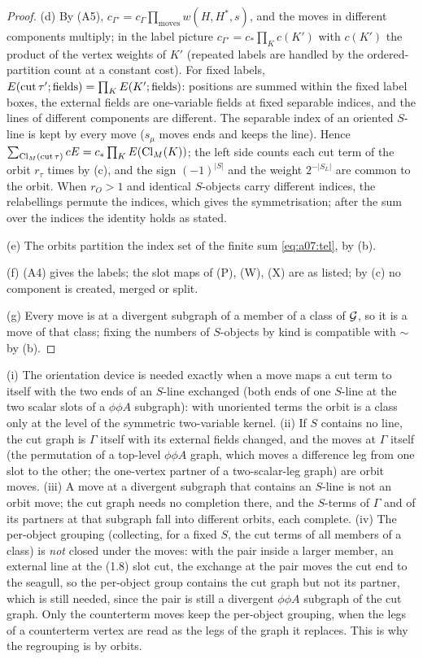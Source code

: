 \begin{proof}
(d) By (A5), $c_{\Gamma'}=c_\Gamma\prod_{\text{moves}}w(H,H^*,s)$, and the moves in different components multiply; in the label picture $c_{\Gamma'}=c_*\prod_Kc(K')$ with $c(K')$ the product of the vertex weights of $K'$ (repeated labels are handled by the ordered-partition count at a constant cost). For fixed labels, $E(\operatorname{cut}\tau';\text{fields})=\prod_KE(K';\text{fields})$: positions are summed within the fixed label boxes, the external fields are one-variable fields at fixed separable indices, and the lines of different components are different. The separable index of an oriented $S$-line is kept by every move ($s_\mu$ moves ends and keeps the line). Hence $\sum_{\operatorname{Cl}_M(\operatorname{cut}\tau)}cE=c_*\prod_KE(\operatorname{Cl}_M(K))$; the left side counts each cut term of the orbit $r_\tau$ times by (c), and the sign $(-1)^{|S|}$ and the weight $2^{-|S_L|}$ are common to the orbit. When $r_O>1$ and identical $S$-objects carry different indices, the relabellings permute the indices, which gives the symmetrisation; after the sum over the indices the identity holds as stated.

(e) The orbits partition the index set of the finite sum \eqref{eq:a07:tel}, by (b).

(f) (A4) gives the labels; the slot maps of (P), (W), (X) are as listed; by (c) no component is created, merged or split.

(g) Every move is at a divergent subgraph of a member of a class of $\mathcal G$, so it is a move of that class; fixing the numbers of $S$-objects by kind is compatible with $\sim$ by (b).
\end{proof}

\begin{remark}\label{rem:a07:orb}
(i) The orientation device is needed exactly when a move maps a cut term to itself with the two ends of an $S$-line exchanged (both ends of one $S$-line at the two scalar slots of a $\phi\phi A$ subgraph): with unoriented terms the orbit is a class only at the level of the symmetric two-variable kernel. (ii) If $S$ contains no line, the cut graph is $\Gamma$ itself with its external fields changed, and the moves at $\Gamma$ itself (the permutation of a top-level $\phi\phi A$ graph, which moves a difference leg from one slot to the other; the one-vertex partner of a two-scalar-leg graph) are orbit moves. (iii) A move at a divergent subgraph that contains an $S$-line is not an orbit move; the cut graph needs no completion there, and the $S$-terms of $\Gamma$ and of its partners at that subgraph fall into different orbits, each complete. (iv) The per-object grouping (collecting, for a fixed $S$, the cut terms of all members of a class) is \emph{not} closed under the moves: with the pair \cite[(2.18)]{Ba3} inside a larger member, an external line at the (1.8) slot cut, the exchange at the pair moves the cut end to the seagull, so the per-object group contains the cut graph but not its partner, which is still needed, since the pair is still a divergent $\phi\phi A$ subgraph of the cut graph. Only the counterterm moves keep the per-object grouping, when the legs of a counterterm vertex are read as the legs of the graph it replaces. This is why the regrouping is by orbits.
\end{remark}




